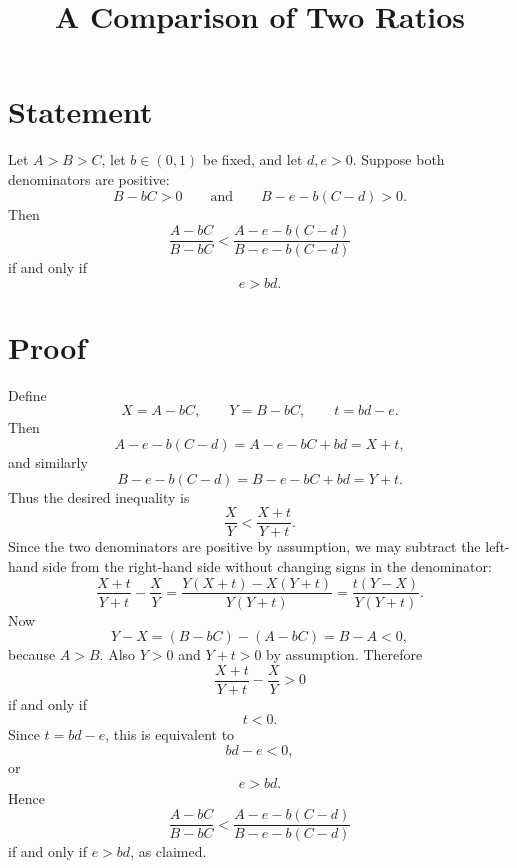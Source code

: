 \documentclass[11pt]{article}
\title{A Comparison of Two Ratios}
\author{}
\date{}
\begin{document}
\maketitle

\section*{Statement}

Let \(A>B>C\), let \(b\in(0,1)\) be fixed, and let \(d,e>0\). Suppose both denominators are positive:
\[
B-bC>0
\qquad\text{and}\qquad
B-e-b(C-d)>0.
\]
Then
\[
\frac{A-bC}{B-bC}
<
\frac{A-e-b(C-d)}{B-e-b(C-d)}
\]
if and only if
\[
e>bd.
\]

\section*{Proof}

Define
\[
X=A-bC,\qquad Y=B-bC,\qquad t=bd-e.
\]
Then
\[
A-e-b(C-d)
=A-e-bC+bd
=X+t,
\]
and similarly
\[
B-e-b(C-d)
=B-e-bC+bd
=Y+t.
\]
Thus the desired inequality is
\[
\frac{X}{Y}<\frac{X+t}{Y+t}.
\]
Since the two denominators are positive by assumption, we may subtract the left-hand side from the right-hand side without changing signs in the denominator:
\[
\frac{X+t}{Y+t}-\frac{X}{Y}
=\frac{Y(X+t)-X(Y+t)}{Y(Y+t)}
=\frac{t(Y-X)}{Y(Y+t)}.
\]
Now
\[
Y-X=(B-bC)-(A-bC)=B-A<0,
\]
because \(A>B\). Also \(Y>0\) and \(Y+t>0\) by assumption. Therefore
\[
\frac{X+t}{Y+t}-\frac{X}{Y}>0
\]
if and only if
\[
t<0.
\]
Since \(t=bd-e\), this is equivalent to
\[
bd-e<0,
\]
or
\[
e>bd.
\]
Hence
\[
\frac{A-bC}{B-bC}
<
\frac{A-e-b(C-d)}{B-e-b(C-d)}
\]
if and only if \(e>bd\), as claimed.
\end{document}
